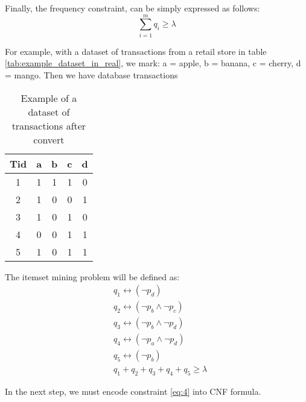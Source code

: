 Finally, the frequency constraint, can be simply expressed as follows:
\begin{equation}
    \label{eq:4}
    \sum_{i=1}^{m} q_i \geq \lambda
\end{equation}

For example, with a dataset of transactions from a retail store in table \ref{tab:example_dataset_in_real}, we mark:
a = apple, b = banana, c = cherry, d = mango. Then we have database transactions

\begin{table}[H]
    \centering
    \caption{Example of a dataset of transactions after convert}
    \label{tab:example_dataset_after_convert}
    \begin{tabular}{|c| c c c c |}
        \hline
        \textbf{Tid} & \textbf{a} & \textbf{b} & \textbf{c} & \textbf{d} \\
        \hline
        1            & 1          & 1          & 1          & 0          \\
        2            & 1          & 0          & 0          & 1          \\
        3            & 1          & 0          & 1          & 0          \\
        4            & 0          & 0          & 1          & 1          \\
        5            & 1          & 0          & 1          & 1          \\
        \hline
    \end{tabular}
\end{table}

The itemset mining problem will be defined as:
\begin{equation*}
    \begin{aligned}
         & q_1 \leftrightarrow (\neg p_d                ) \\
         & q_2 \leftrightarrow (\neg p_b \wedge \neg p_c) \\
         & q_3 \leftrightarrow (\neg p_b \wedge \neg p_d) \\
         & q_4 \leftrightarrow (\neg p_a \wedge \neg p_d) \\
         & q_5 \leftrightarrow (\neg p_b                ) \\
         & q_1 + q_2 + q_3 + q_4 + q_5 \geq \lambda
    \end{aligned}
\end{equation*}

In the next step, we must encode constraint \ref{eq:4} into CNF formula.
